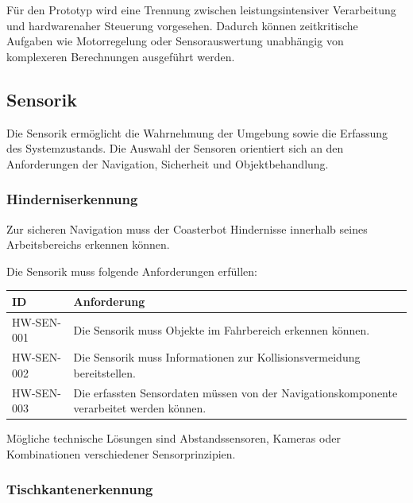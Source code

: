 \documentclass[
  a4paper,
  12pt,
  DIV=12,        %
  parskip=half,  %
  headings=small %
]{scrartcl}
\theoremstyle{definition}
\theoremstyle{definition}
\begin{document}
Für den Prototyp wird eine Trennung zwischen leistungsintensiver
Verarbeitung und hardwarenaher Steuerung vorgesehen. Dadurch können
zeitkritische Aufgaben wie Motorregelung oder Sensorauswertung
unabhängig von komplexeren Berechnungen ausgeführt werden.

\subsection{Sensorik}\label{sensorik}

Die Sensorik ermöglicht die Wahrnehmung der Umgebung sowie die Erfassung
des Systemzustands. Die Auswahl der Sensoren orientiert sich an den
Anforderungen der Navigation, Sicherheit und Objektbehandlung.

\subsubsection{Hinderniserkennung}\label{hinderniserkennung}

Zur sicheren Navigation muss der Coasterbot Hindernisse innerhalb seines
Arbeitsbereichs erkennen können.

Die Sensorik muss folgende Anforderungen erfüllen:

\begin{longtable}[]{@{}
  >{\raggedright\arraybackslash}p{}
  >{\raggedright\arraybackslash}p{}@{}}
\toprule\noalign{}
\begin{minipage}[b]{\linewidth}\raggedright
ID
\end{minipage} & \begin{minipage}[b]{\linewidth}\raggedright
Anforderung
\end{minipage} \\
\midrule\noalign{}
\endhead
\bottomrule\noalign{}
\endlastfoot
HW-SEN-001 & Die Sensorik muss Objekte im Fahrbereich erkennen
können. \\
HW-SEN-002 & Die Sensorik muss Informationen zur Kollisionsvermeidung
bereitstellen. \\
HW-SEN-003 & Die erfassten Sensordaten müssen von der
Navigationskomponente verarbeitet werden können. \\
\end{longtable}

Mögliche technische Lösungen sind Abstandssensoren, Kameras oder
Kombinationen verschiedener Sensorprinzipien.

\subsubsection{Tischkantenerkennung}\label{tischkantenerkennung}
\end{document}
